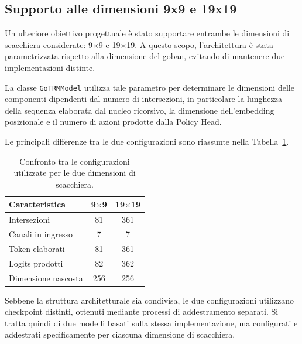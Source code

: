 \subsection{Supporto alle dimensioni 9x9 e 19x19}

Un ulteriore obiettivo progettuale è stato supportare entrambe le dimensioni di scacchiera considerate: 9$\times$9 e 19$\times$19. A questo scopo, l'architettura è stata parametrizzata rispetto alla dimensione del goban, evitando di mantenere due implementazioni distinte.

La classe \texttt{GoTRMModel} utilizza tale parametro per determinare le dimensioni delle componenti dipendenti dal numero di intersezioni, in particolare la lunghezza della sequenza elaborata dal nucleo ricorsivo, la dimensione dell'embedding posizionale e il numero di azioni prodotte dalla Policy Head.

Le principali differenze tra le due configurazioni sono riassunte nella Tabella~\ref{tab:board_size_comparison}.

\begin{table}[H]
    \centering
    \begin{tabular}{l|c|c}
        \textbf{Caratteristica} & \textbf{9$\times$9} & \textbf{19$\times$19} \\
        \hline
        Intersezioni            & 81                  & 361                   \\
        Canali in ingresso      & 7                   & 7                     \\
        Token elaborati         & 81                  & 361                   \\
        Logits prodotti         & 82                  & 362                   \\
        Dimensione nascosta     & 256                 & 256
    \end{tabular}
    \caption{Confronto tra le configurazioni utilizzate per le due dimensioni di scacchiera.}
    \label{tab:board_size_comparison}
\end{table}

Sebbene la struttura architetturale sia condivisa, le due configurazioni utilizzano checkpoint distinti, ottenuti mediante processi di addestramento separati. Si tratta quindi di due modelli basati sulla stessa implementazione, ma configurati e addestrati specificamente per ciascuna dimensione di scacchiera.

